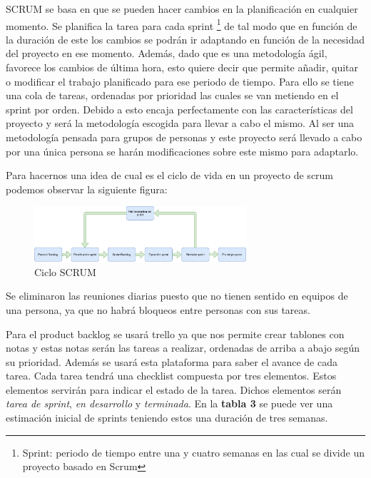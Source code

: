\documentclass[11pt,a4paper,twoside,final]{article}
\begin{document}
SCRUM se basa en que se pueden hacer cambios en la planificación en cualquier momento. Se planifica la tarea para cada sprint \footnote{Sprint: periodo de tiempo entre una y cuatro semanas en las cual se divide un proyecto basado en Scrum} de tal modo que en función de la duración de este los cambios se podrán ir adaptando en función de la necesidad del proyecto en ese momento. Además, dado que es una metodología ágil, favorece los cambios de última hora, esto quiere decir que permite añadir, quitar o modificar el trabajo planificado para ese periodo de tiempo. Para ello se tiene una cola de tareas, ordenadas por prioridad las cuales se van metiendo en el sprint por orden. Debido a esto encaja perfectamente con las características del proyecto y será la metodología escogida para llevar a cabo el mismo. Al ser una metodología pensada para grupos de personas y este proyecto será llevado a cabo por una única persona se harán modificaciones sobre este mismo para adaptarlo.

Para hacernos una idea de cual es el ciclo de vida en un proyecto de scrum podemos observar la siguiente figura:

\begin{figure}[H]
  \centering
   \includegraphics[width=0.7\textwidth]{Scrum.pdf}
  \caption{Ciclo SCRUM}
  \label{Ciclo SCRUM}
\end{figure}

Se eliminaron las reuniones diarias puesto que no tienen sentido en equipos de una persona, ya que no habrá bloqueos entre personas con sus tareas.

\bigskip

Para el product backlog se usará trello \cite{trello} ya que nos permite crear tablones con notas y estas notas serán las tareas a realizar, ordenadas de arriba a abajo según su prioridad. Además se usará esta plataforma para saber el avance de cada tarea. Cada tarea tendrá una checklist compuesta por tres elementos. Estos elementos servirán para indicar el estado de la tarea. Dichos elementos serán \textit{tarea de sprint}, \textit{en desarrollo} y \textit{terminada}. En la \textbf{tabla 3} se puede ver una estimación inicial de sprints teniendo estos una duración de tres semanas.
\end{document}
